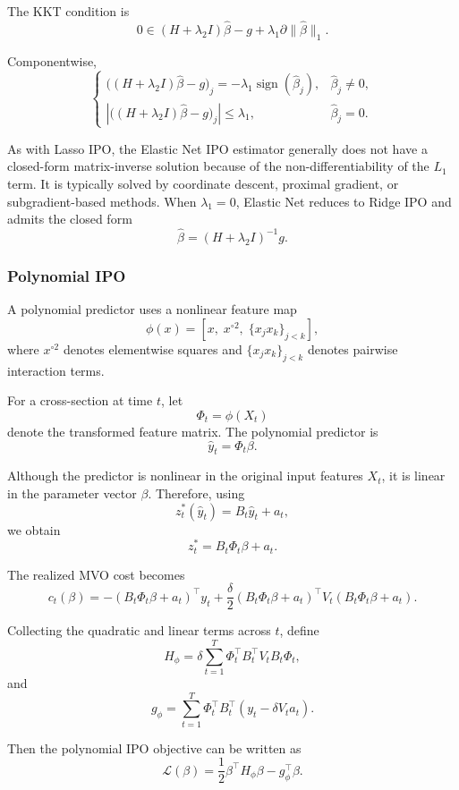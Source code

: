 \documentclass{article}
\begin{document}
The KKT condition is
\[
0
\in
(H+\lambda_2 I)\hat\beta
-
g
+
\lambda_1 \partial\|\hat\beta\|_1.
\]

Componentwise,
\[
\boxed{
\begin{cases}
\bigl((H+\lambda_2 I)\hat\beta - g\bigr)_j
=
-\lambda_1\operatorname{sign}(\hat\beta_j),
& \hat\beta_j\neq 0,\\[4pt]
\left|
\bigl((H+\lambda_2 I)\hat\beta - g\bigr)_j
\right|
\leq \lambda_1,
& \hat\beta_j=0.
\end{cases}
}
\]

As with Lasso IPO, the Elastic Net IPO estimator generally does not have a
closed-form matrix-inverse solution because of the non-differentiability of the
\(L_1\) term. It is typically solved by coordinate descent, proximal gradient,
or subgradient-based methods. When \(\lambda_1=0\), Elastic Net reduces to
Ridge IPO and admits the closed form
\[
\hat\beta
=
(H+\lambda_2 I)^{-1}g.
\]

\subsubsection{Polynomial IPO}

A polynomial predictor uses a nonlinear feature map
\[
\phi(x)
=
\left[
x,\;
x^{\circ 2},\;
\{x_jx_k\}_{j<k}
\right],
\]
where \(x^{\circ 2}\) denotes elementwise squares and
\(\{x_jx_k\}_{j<k}\) denotes pairwise interaction terms.

For a cross-section at time \(t\), let
\[
\Phi_t = \phi(X_t)
\]
denote the transformed feature matrix. The polynomial predictor is
\[
\hat y_t = \Phi_t \beta.
\]

Although the predictor is nonlinear in the original input features \(X_t\), it
is linear in the parameter vector \(\beta\). Therefore, using
\[
z_t^*(\hat y_t) = B_t\hat y_t + a_t,
\]
we obtain
\[
z_t^*
=
B_t\Phi_t\beta + a_t.
\]

The realized MVO cost becomes
\[
c_t(\beta)
=
-\left(B_t\Phi_t\beta+a_t\right)^\top y_t
+
\frac{\delta}{2}
\left(B_t\Phi_t\beta+a_t\right)^\top
V_t
\left(B_t\Phi_t\beta+a_t\right).
\]

Collecting the quadratic and linear terms across \(t\), define
\[
H_{\phi}
=
\delta
\sum_{t=1}^T
\Phi_t^\top B_t^\top V_t B_t \Phi_t,
\]
and
\[
g_{\phi}
=
\sum_{t=1}^T
\Phi_t^\top B_t^\top
\left(
y_t - \delta V_t a_t
\right).
\]

Then the polynomial IPO objective can be written as
\[
\mathcal L(\beta)
=
\frac{1}{2}\beta^\top H_{\phi}\beta
-
g_{\phi}^\top \beta.
\]
\end{document}

